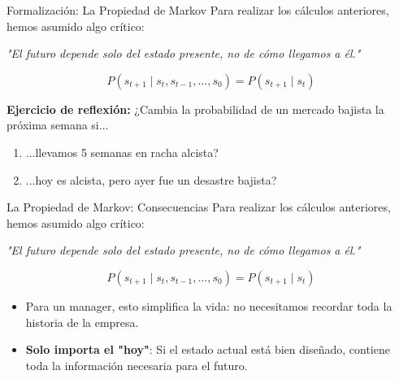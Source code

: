 \documentclass[xcolor=dvipsnames]{beamer}
\begin{document}
\begin{frame}{Formalización: La Propiedad de Markov}
Para realizar los cálculos anteriores, hemos asumido algo crítico:
\begin{center}
\textit{"{}El futuro depende solo del estado presente, no de cómo llegamos a él."}
\end{center}

\begin{definition}
$$P(s_{t+1} \mid s_t, s_{t-1}, \dots, s_0) = P(s_{t+1} \mid s_t)$$
\end{definition}

\vspace{0.3cm}
\textbf{Ejercicio de reflexión:}
¿Cambia la probabilidad de un mercado bajista la próxima semana si...
\begin{enumerate}
    \item ...llevamos 5 semanas en racha alcista?
    \item ...hoy es alcista, pero ayer fue un desastre bajista?
\end{enumerate}
\end{frame}


\begin{frame}{La Propiedad de Markov: Consecuencias}
Para realizar los cálculos anteriores, hemos asumido algo crítico:
\begin{center}
\textit{"{}El futuro depende solo del estado presente, no de cómo llegamos a él."}
\end{center}

\begin{definition}
$$P(s_{t+1} \mid s_t, s_{t-1}, \dots, s_0) = P(s_{t+1} \mid s_t)$$
\end{definition}
\vspace{0.3cm}
\begin{itemize}
    \item Para un manager, esto simplifica la vida: no necesitamos recordar toda la historia de la empresa.
    \item \textbf{Solo importa el "hoy"}: Si el estado actual está bien diseñado, contiene toda la información necesaria para el futuro.
\end{itemize}
\end{frame}
\end{document}
